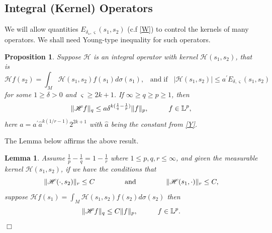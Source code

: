 \documentclass[10pt]{article}
\newtheorem{prop}[thm]{Proposition}
\newtheorem{lem}[thm]{Lemma}
\theoremstyle{definition}
\numberwithin{equation}{section}
\begin{document}
	\subsection{Integral (Kernel) Operators}
	We will allow quantities $E_{\delta_{\star}, \varsigma}(s_1,s_2)$ (c.f \eqref{W}) to control the kernels of many operators. We shall need Young-type inequality for such operators.\\
	\begin{prop}\label{C}
		\normalfont
		Suppose $\mathscr{H}$ is an integral operator with kernel $\mathscr{H} (s_1,s_2)$, that is
		$$ \mathscr{H}f(s_2) = \int_M \mathscr{H}(s_1,s_2) f(s_1) d \sigma (s_1), \;\;\; \mbox{and}\; \mbox{if} \;\;\; |\mathscr{H} (s_1,s_2) | \leq a^{\prime} E_{\delta, \varsigma} (s_1,s_2) $$
		for some $1\geq \delta >0$ and $\varsigma \geq 2k+1$. If $\infty \geq q \geq p \geq 1$, then
		\begin{equation}\label{S}
			\lVert \mathscr{H}f \rVert_q \leq a\delta^{k(\frac{1}{q} - \frac{1}{p})} \lVert f \rVert_p, \hspace{1 cm} f \in \mathbb{L}^p,
		\end{equation}
		here $a=a^{\prime} \hat{a}^{k(1/r-1)} 2^{2k+1}$ with $\hat{a}$ being the constant from \eqref{Y}.
	\end{prop}
	The Lemma below affirms the above result.
	\begin{lem}\label{D}
		\normalfont
		Assume $ \frac{1}{p} - \frac{1}{q} = 1 - \frac{1}{r}$ where $1\leq p,q,r\leq \infty$, and given the measurable kernel $ \mathscr{H} (s_1,s_2)$, if we have the conditions that
		\begin{equation*}
			\lVert \mathscr{H}(\cdot,s_2) \rVert_r \leq C \hspace{1.5 cm} \mbox{and} \hspace{1.5 cm} \lVert \mathscr{H}(s_1, \cdot) \rVert_r \leq C,
		\end{equation*}
		suppose $\mathscr{H}f(s_1) = \displaystyle\int_M \mathscr{H}(s_1,s_2)f(s_2)d\sigma(s_2)$ then
		$$ \lVert \mathscr{H}f \rVert_q \leq C \lVert f \rVert_p, \hspace{1 cm} f \in \mathbb{L}^p.$$\hfill{$\Box$}
	\end{lem}
\end{document}
